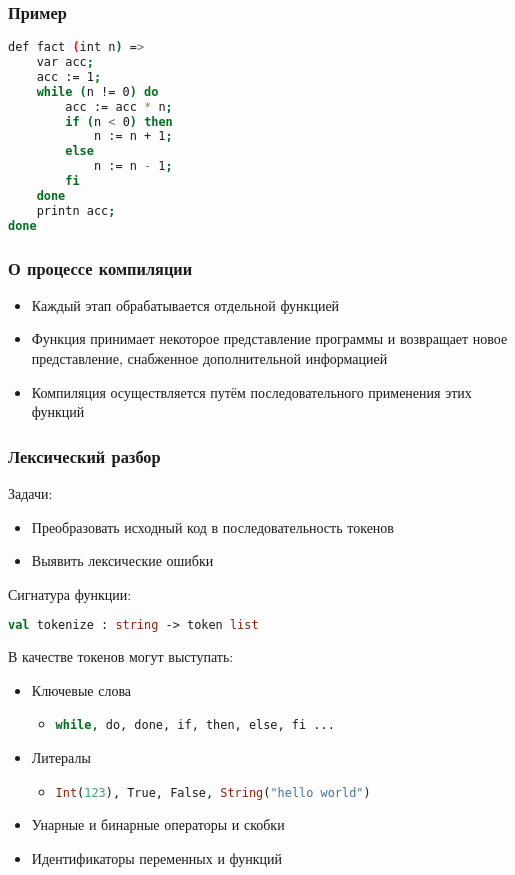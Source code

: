 \documentclass{beamer}
\begin{document}
	\begin{frame}[fragile]
		\frametitle{Пример}
	\begin{lstlisting}[language=BASH] 
def fact (int n) =>
	var acc;
	acc := 1;
	while (n != 0) do
		acc := acc * n;
		if (n < 0) then
			n := n + 1;
		else
			n := n - 1;
		fi
	done 
	printn acc;
done
	\end{lstlisting}
	\end{frame}

	\begin{frame}
		\frametitle{О процессе компиляции}
			\begin{itemize}
			\item Каждый этап обрабатывается отдельной функцией
			\item Функция принимает некоторое представление программы и возвращает новое представление, снабженное дополнительной информацией
			\item Компиляция осуществляется путём последовательного применения этих функций
			\end{itemize}
	\end{frame}

	\begin{frame}[fragile]
		\frametitle{Лексический разбор}
			Задачи:
			\begin{itemize}
				\item Преобразовать исходный код в последовательность токенов
				\item Выявить лексические ошибки
			\end{itemize}
			Сигнатура функции:

			\begin{lstlisting}[language=ML] 
	val tokenize : string -> token list
			\end{lstlisting}

			В качестве токенов могут выступать:
			\begin{itemize}
				\item Ключевые слова
				\begin{itemize}
					\item \lstinline[language=BASH]|while, do, done, if, then, else, fi ...|
				\end{itemize}
				\item Литералы
				\begin{itemize}
					\item \lstinline[language=ML]|Int(123), True, False, String("hello world")|
				\end{itemize}
				\item Унарные и бинарные операторы и скобки
				\item Идентификаторы переменных и функций
			\end{itemize}
	\end{frame}
\end{document}

